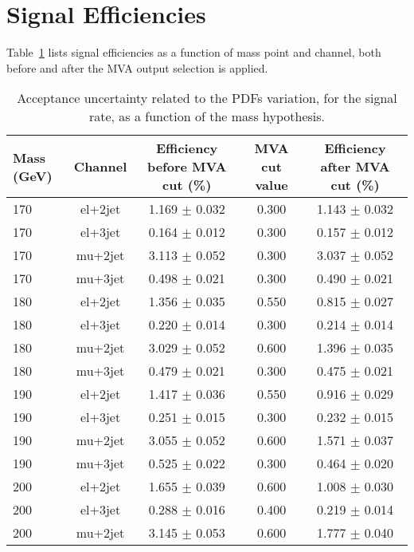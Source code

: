 \section{Signal Efficiencies}
\label{sec:sigeff}

Table~\ref{tab:sigeff} lists signal efficiencies as a function of mass point
and channel, both before and after the MVA output selection is applied.

\begin{table}
  \caption{Acceptance uncertainty related to the PDFs variation, 
           for the signal rate, as a function of the mass hypothesis.
  \label{tab:sigeff}}
\begin{center}
{\footnotesize
\begin{tabular}{l|c|c|c|c}
\hline
Mass (GeV) & Channel &  Efficiency before MVA cut (\%) & MVA cut value & Efficiency after MVA cut (\%) \\
\hline
170 & el+2jet  &   1.169 $\pm$ 0.032   &  0.300   &   1.143 $\pm$ 0.032  \\
170 & el+3jet  &   0.164 $\pm$ 0.012   &  0.300   &   0.157 $\pm$ 0.012  \\
170 & mu+2jet  &   3.113 $\pm$ 0.052   &  0.300   &   3.037 $\pm$ 0.052  \\
170 & mu+3jet  &   0.498 $\pm$ 0.021   &  0.300   &   0.490 $\pm$ 0.021  \\
\hline
180 & el+2jet  &   1.356 $\pm$ 0.035   &  0.550   &   0.815 $\pm$ 0.027  \\
180 & el+3jet  &   0.220 $\pm$ 0.014   &  0.300   &   0.214 $\pm$ 0.014  \\
180 & mu+2jet  &   3.029 $\pm$ 0.052   &  0.600   &   1.396 $\pm$ 0.035  \\
180 & mu+3jet  &   0.479 $\pm$ 0.021   &  0.300   &   0.475 $\pm$ 0.021  \\
\hline
190 & el+2jet  &   1.417 $\pm$ 0.036   &  0.550   &   0.916 $\pm$ 0.029  \\
190 & el+3jet  &   0.251 $\pm$ 0.015   &  0.300   &   0.232 $\pm$ 0.015  \\
190 & mu+2jet  &   3.055 $\pm$ 0.052   &  0.600   &   1.571 $\pm$ 0.037  \\
190 & mu+3jet  &   0.525 $\pm$ 0.022   &  0.300   &   0.464 $\pm$ 0.020  \\
\hline
200 & el+2jet  &   1.655 $\pm$ 0.039   &  0.600   &   1.008 $\pm$ 0.030  \\
200 & el+3jet  &   0.288 $\pm$ 0.016   &  0.400   &   0.219 $\pm$ 0.014  \\
200 & mu+2jet  &   3.145 $\pm$ 0.053   &  0.600   &   1.777 $\pm$ 0.040  \\

\end{tabular}}
\end{center}
\end{table}
